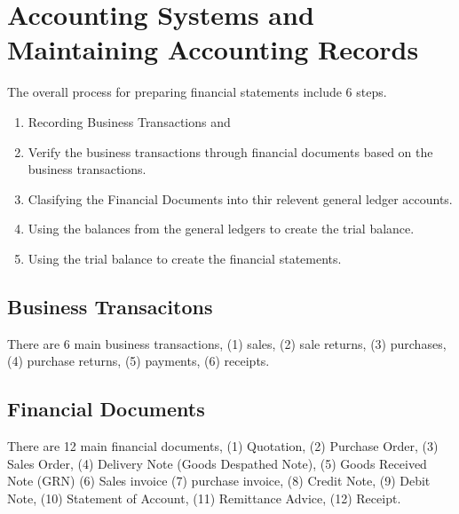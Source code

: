 \section{Accounting Systems and Maintaining Accounting Records}


The overall process for preparing financial statements include 6 steps.

\begin{enumerate} 
    \item Recording Business Transactions and 
    \item Verify the business transactions through financial documents based on the business transactions.
    \item Clasifying the Financial Documents into thir relevent general ledger accounts.
    \item Using the balances from the general ledgers to create the trial balance.
    \item Using the trial balance to create the financial statements. 
\end{enumerate}

\subsection{Business Transacitons} 

There are 6 main business transactions, (1) sales, (2) sale returns, (3) purchases, (4) purchase returns, (5) payments, (6) receipts.

\subsection{Financial Documents} 

There are 12 main financial documents, (1) Quotation, (2) Purchase Order, (3) Sales Order, (4) Delivery Note (Goods Despathed Note), (5) Goods Received Note (GRN) 
(6) Sales invoice (7) purchase invoice, (8) Credit Note, (9) Debit Note, (10) Statement of Account, (11) Remittance Advice, (12) Receipt. 
